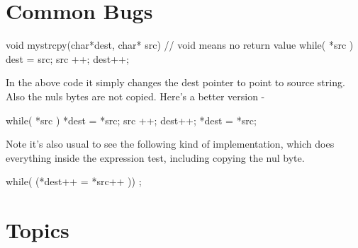 \begin{comment}
\subsection{Two places for strings}\label{two-places-for-strings}

Whenever you define a constant string (ie one in the form
\keyword{char*\ str\ =\ "constant"}) That string is stored in the
\emph{data} or \emph{code} segment that is \textbf{read-only} meaning
that any attempt to modify the string will cause a segfault.

If one, however, \keyword{malloc}'s space, one can change that string to
be whatever they want.

\subsection{Remember the NULL byte!}\label{remember-the-null-byte}

Forgetting to NULL terminate a string is a big affect on the strings!
Bounds checking is important. The heart bleed bug mentioned earlier in
the wiki book is partially because of this.

\end{comment}

\section{Common Bugs}

\begin{code}[language=C]
void mystrcpy(char*dest, char* src) { 
  // void means no return value   
  while( *src ) { dest = src; src ++; dest++; }  
}
\end{code}

In the above code it simply changes the dest pointer to point to source
string. Also the nuls bytes are not copied. Here's a better version -

\begin{code}[language=C]
  while( *src ) { *dest = *src; src ++; dest++; } 
  *dest = *src;
\end{code}

Note it's also usual to see the following kind of implementation, which
does everything inside the expression test, including copying the nul
byte.

\begin{code}[language=C]
  while( (*dest++ = *src++ )) {};
\end{code}

\section{Topics}

